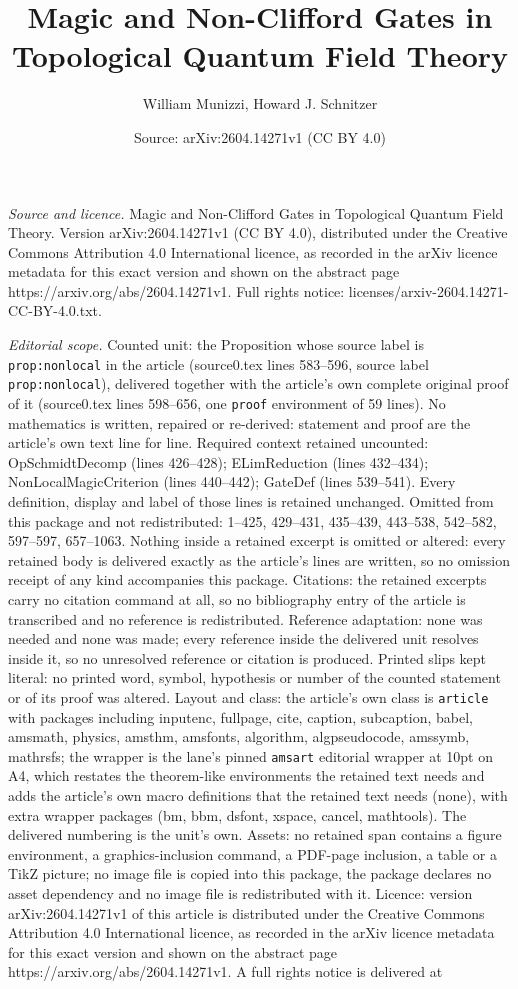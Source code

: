 \documentclass[10pt,a4paper]{amsart}
\title[Magic and Non-Clifford Gates in Topological Quantum Field Th]{Magic and Non-Clifford Gates in Topological Quantum Field Theory}
\author{William Munizzi, Howard J. Schnitzer}
\date{Source: arXiv:2604.14271v1 (CC BY 4.0)}
\begin{document}
\maketitle

\noindent\emph{Source and licence.} Magic and Non-Clifford Gates in Topological Quantum Field Theory. Version arXiv:2604.14271v1 (CC BY 4.0), distributed under the Creative Commons Attribution 4.0 International licence, as recorded in the arXiv licence metadata for this exact version and shown on the abstract page https://arxiv.org/abs/2604.14271v1. Full rights notice: licenses/arxiv-2604.14271-CC-BY-4.0.txt.\par\smallskip

\noindent\textit{Editorial scope.} Counted unit: the Proposition whose source label is \texttt{prop:nonlocal} in the article (source0.tex lines 583--596, source label \texttt{prop:nonlocal}), delivered together with the article's own complete original proof of it (source0.tex lines 598--656, one \texttt{proof} environment of 59 lines). No mathematics is written, repaired or re-derived: statement and proof are the article's own text line for line. Required context retained uncounted: OpSchmidtDecomp (lines 426--428); ELimReduction (lines 432--434); NonLocalMagicCriterion (lines 440--442); GateDef (lines 539--541). Every definition, display and label of those lines is retained unchanged. Omitted from this package and not redistributed: 1--425, 429--431, 435--439, 443--538, 542--582, 597--597, 657--1063. Nothing inside a retained excerpt is omitted or altered: every retained body is delivered exactly as the article's lines are written, so no omission receipt of any kind accompanies this package. Citations: the retained excerpts carry no citation command at all, so no bibliography entry of the article is transcribed and no reference is redistributed. Reference adaptation: none was needed and none was made; every reference inside the delivered unit resolves inside it, so no unresolved reference or citation is produced. Printed slips kept literal: no printed word, symbol, hypothesis or number of the counted statement or of its proof was altered. Layout and class: the article's own class is \texttt{article} with packages including inputenc, fullpage, cite, caption, subcaption, babel, amsmath, physics, amsthm, amsfonts, algorithm, algpseudocode, amssymb, mathrsfs; the wrapper is the lane's pinned \texttt{amsart} editorial wrapper at 10pt on A4, which restates the theorem-like environments the retained text needs and adds the article's own macro definitions that the retained text needs (none), with extra wrapper packages (bm, bbm, dsfont, xspace, cancel, mathtools). The delivered numbering is the unit's own. Assets: no retained span contains a figure environment, a graphics-inclusion command, a PDF-page inclusion, a table or a TikZ picture; no image file is copied into this package, the package declares no asset dependency and no image file is redistributed with it. Licence: version arXiv:2604.14271v1 of this article is distributed under the Creative Commons Attribution 4.0 International licence, as recorded in the arXiv licence metadata for this exact version and shown on the abstract page https://arxiv.org/abs/2604.14271v1. A full rights notice is delivered at 
\end{document}
